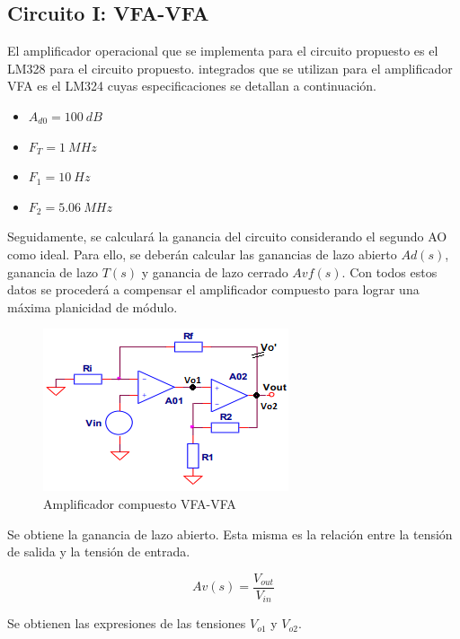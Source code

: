 \subsection{Circuito I: VFA-VFA}
\hspace{1mm} El amplificador operacional que se implementa para el circuito propuesto es el LM328 para el circuito propuesto.  integrados que se utilizan para el amplificador VFA es el LM324 cuyas especificaciones se detallan a continuación.

\begin{itemize}[itemsep=1pt]
    \item \(A_{d0}=100~dB\)
    \item \(F_T=1~MHz\)
    \item \(F_1=10~Hz\)
    \item \(F_2=5.06~MHz\)
\end{itemize}

\bigskip
\hspace{1mm} Seguidamente, se calculará la ganancia del circuito considerando el segundo AO como ideal. Para ello, se deberán calcular las ganancias de lazo abierto \(Ad(s)\), ganancia de lazo \(T(s)\) y ganancia de lazo cerrado \(Avf(s)\). Con todos estos datos se procederá a compensar el amplificador compuesto para lograr una máxima planicidad de módulo.

\begin{figure}[!h]
    \centering
    \includegraphics[scale=1.2]{Imagenes/Punto1LazoCerradoVoP.png}
    \caption{Amplificador compuesto VFA-VFA}
\end{figure}

\hspace{1mm} Se obtiene la ganancia de lazo abierto. Esta misma es la relación entre la tensión de salida y la tensión de entrada.

\begin{equation}
    Av(s) = \frac{V_{out}}{V_{in}}
\end{equation}

\bigskip
\hspace{1mm} Se obtienen las expresiones de las tensiones \(V_{o1}\) y \(V_{o2}\).

